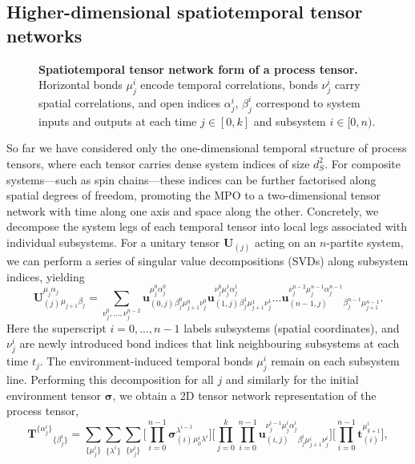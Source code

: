 \subsection{Higher-dimensional spatiotemporal tensor networks}
\begin{figure}
    \centering
    
    \caption{\textbf{Spatiotemporal tensor network form of a process tensor.} Horizontal bonds \(\mu_j^i\) encode temporal correlations, bonds \(\nu_j^i\) carry spatial correlations, and open indices \(\alpha_j^i\), \(\beta_j^i\) correspond to system inputs and outputs at each time \(j \in [0,k]\) and subsystem \(i \in [0,n)\).}
    \label{fig:tensor-network-2d}
\end{figure}
So far we have considered only the one-dimensional temporal structure of process tensors, where each tensor carries dense system indices of size \(d^2_S\). For composite systems---such as spin chains---these indices can be further factorised along spatial degrees of freedom, promoting the MPO to a two-dimensional tensor network with time along one axis and space along the other. Concretely, we decompose the system legs of each temporal tensor into local legs 
associated with individual subsystems. For a unitary tensor \(\mathbf{U}_{(j)}\) acting on an \(n\)-partite system, we can perform a series of singular value decompositions (SVDs) along subsystem indices, yielding
\begin{equation}
    \mathbf{U}_{(j)}^{\mu_j\alpha_j}{}_{\mu_{j+1}\beta_j} 
    = \sum_{\nu_j^0,\dots,\nu_j^{n-2}}
    \mathbf{u}_{(0,j)}^{\mu_j^0\alpha_j^0}{}_{\beta_j^0\mu_{j+1}^0\nu_j^0}
    \mathbf{u}_{(1,j)}^{\nu_j^0\mu_j^1\alpha_j^1}{}_{\beta_j^1\mu_{j+1}^1\nu_j^1}\dots 
    \mathbf{u}_{(n-1,j)}^{\nu_j^{n-2}\mu_j^{n-1}\alpha_j^{n-1}}{}_{\beta_j^{n-1}\mu_{j+1}^{n-1}}.
\end{equation}
Here the superscript \(i=0,\dots,n-1\) labels subsystems (spatial coordinates), and \(\nu^i_j\) are newly introduced bond indices that link neighbouring subsystems at each time \(t_j\). The environment-induced temporal bonds \(\mu^i_j\) remain on each subsystem line. Performing this decomposition for all \(j\) and similarly for the initial environment tensor \(\pmb{\sigma}\), we obtain a 2D tensor network representation of the process tensor,
\begin{equation}
    \mathbf{T}^{\{\alpha_j^i\}}{}_{\{\beta_j^i\}} = 
    \sum_{\{\mu_j^i\}} \sum_{\{\lambda^i\}} \sum_{\{\nu_j^i\}}
    \Biggl[\prod_{i=0}^{n-1}\pmb{\sigma}_{(i)}^{\lambda^{i-1}}{}_{\mu_0^i\lambda^i}\Biggr]
    \Biggl[\prod_{j=0}^{k}\prod_{i=0}^{n-1}\mathbf{u}_{(i, j)}^{\nu^{i-1}_j\mu_j^i\alpha_j^i}{}_{\beta_j^i\mu_{j+1}^i\nu_j^i}\Biggr]
    \Biggl[\prod_{i=0}^{n-1}\mathbf{t}_{(i)}^{\mu_{k+1}^i}\Biggr],
\end{equation}
